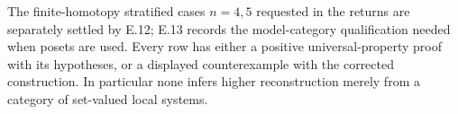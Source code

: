 The finite-homotopy stratified cases $n=4,5$ requested in the returns are separately settled by E.12; E.13 records the model-category qualification needed when posets are used. Every row has either a positive universal-property proof with its hypotheses, or a displayed counterexample with the corrected construction. In particular none infers higher reconstruction merely from a category of set-valued local systems.
